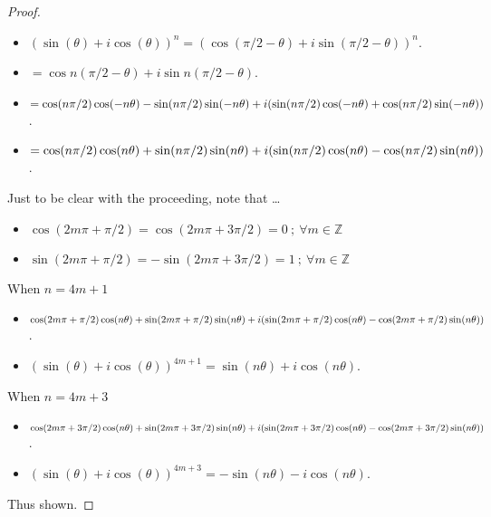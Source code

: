 \documentclass[12pt]{article}
\newcommand{\ds}{\displaystyle}
\theoremstyle{plain}
\begin{document}
\begin{proof}
  \ \\

  \begin{itemize}
    \item $ \ds (\sin(\theta) + i\cos(\theta))^{n} = (\cos(\pi/2 - \theta) + i\sin(\pi/2 - \theta))^{n} $. 
    \item $ \ds = \cos{n(\pi/2 - \theta)} + i\sin{n(\pi/2 - \theta)} $.
    \item $ \ds = \cos(n\pi/2)\cos(-n\theta) - \sin(n\pi/2)\sin(-n\theta) + \\ i(\sin(n\pi/2)\cos(-n\theta) + \cos(n\pi/2)\sin(-n\theta)) $.
    \item $ \ds = \cos(n\pi/2)\cos(n\theta) + \sin(n\pi/2)\sin(n\theta) + \\ i(\sin(n\pi/2)\cos(n\theta) - \cos(n\pi/2)\sin(n\theta)) $.
  \end{itemize}

  Just to be clear with the proceeding, note that \dots

  \begin{itemize}
    \item $ \ds \cos(2m\pi + \pi/2) = \cos(2m\pi + 3\pi/2) = 0 \ ; \ \forall m \in \mathbb{Z} $
    \item $ \ds \sin(2m\pi + \pi/2) = -\sin(2m\pi + 3\pi/2) = 1 \ ; \ \forall m \in \mathbb{Z} $
\end{itemize}

  When $ n = 4m + 1 $
  \begin{itemize}
    \item $ \ds \cos(2m\pi + \pi/2)\cos(n\theta) + \sin(2m\pi + \pi/2)\sin(n\theta) + \\ i(\sin(2m\pi + \pi/2)\cos(n\theta) - \cos(2m\pi + \pi/2)\sin(n\theta)) $.
    \item $ \ds (\sin(\theta) + i\cos(\theta))^{4m + 1} = \sin(n\theta) + i\cos(n\theta) $.
  \end{itemize}

  When $ n = 4m + 3 $
  \begin{itemize}
    \item $ \ds \cos(2m\pi + 3\pi/2)\cos(n\theta) + \sin(2m\pi + 3\pi/2)\sin(n\theta) + \\ i(\sin(2m\pi + 3\pi/2)\cos(n\theta) - \cos(2m\pi + 3\pi/2)\sin(n\theta)) $.
    \item $ \ds (\sin(\theta) + i\cos(\theta))^{4m + 3} = -\sin(n\theta) - i\cos(n\theta) $.
  \end{itemize}

  Thus shown. 

\end{proof}
\end{document}
